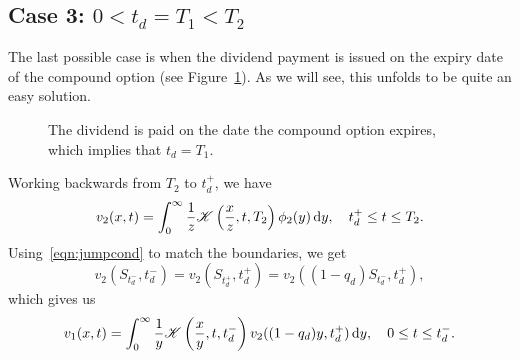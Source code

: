 \subsection{Case 3: $0 < t_d = T_1 < T_2$}
The last possible case is when the dividend payment is issued on the expiry date of the compound option (see Figure~\ref{fig:4}). As we will see, this unfolds to be quite an easy solution.

\begin{figure}[!h]
\centering
{}
\caption{The dividend is paid on the date the compound option expires, which implies that $t_d = T_1$.}
\label{fig:4}
\end{figure}
\noindent
Working backwards from $T_2$ to $t_d^+$, we have
		\begin{equation}
			\label{eqn:v2b}
			v_2(x,t) = \int_0^\infty \frac{1}{z} \mathscr K\left( \frac{x}{z}, t, T_2 \right) \phi_2(y) \, \mathrm d y, \quad t_d^+ \leq t \leq T_2.
		\end{equation}
Using~\eqref{eqn:jumpcond} to match the boundaries, we get
		$$
			v_2\left(S_{t_d^-},t_d^-\right) = v_2\left(S_{t_d^+},t_d^+\right) = v_2\left((1-q_d)S_{t_d^-},t_d^+\right),
		$$
which gives us
		\begin{equation}
			\label{eqn:v1c}
			v_1(x,t) = \int_0^\infty \frac{1}{y} \mathscr K\left( \frac{x}{y}, t, t_d^- \right) v_2((1-q_d)y, t_d^+) \, \mathrm d y, \quad 0 \leq t \leq t_d^-.
		\end{equation}

